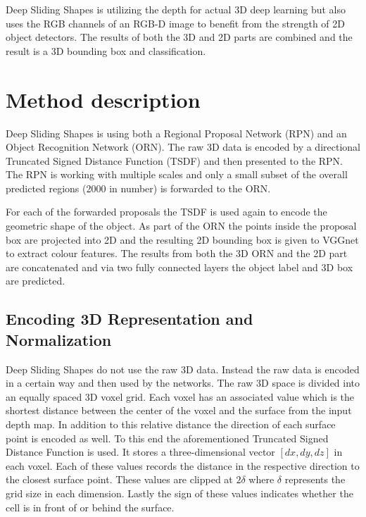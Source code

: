 \documentclass[12pt]{scrartcl}
\begin{document}
Deep Sliding Shapes\cite{Song2016} is utilizing the depth for actual 3D deep
learning but also uses the RGB channels of an RGB-D image to benefit from the
strength of 2D object detectors. The results of both the 3D and 2D parts are
combined and the result is a 3D bounding box and classification.

\section{Method description}

Deep Sliding Shapes\cite{Song2016} is using both a Regional Proposal Network (RPN) and an
Object Recognition Network (ORN). The raw 3D data is encoded by a directional
Truncated Signed Distance Function (TSDF) and then presented to the RPN.
The RPN is working with multiple scales and only a small subset of the overall
predicted regions (2000 in number) is forwarded to the ORN.

For each of the forwarded proposals the TSDF is used again to encode the geometric
shape of the object. As part of the ORN the points inside the proposal box
are projected into 2D and the resulting 2D bounding box is given to VGGnet\cite{Simonyan2015}
to extract colour features. The results from both the 3D ORN and the 2D part
are concatenated and via two fully connected layers the object label and 3D box
are predicted.

\subsection{Encoding 3D Representation and Normalization}

Deep Sliding Shapes do not use the raw 3D data. Instead the raw data is
encoded in a certain way and then used by the networks. The raw 3D space
is divided into an equally spaced 3D voxel grid. Each voxel has an associated
value which is the shortest distance between the center of the voxel and
the surface from the input depth map. In addition to this relative distance
the direction of each surface point is encoded as well. To this end the
aforementioned Truncated Signed Distance Function is used. It stores a
three-dimensional vector \([dx, dy, dz]\) in each voxel. Each of these
values records the distance in the respective direction to the closest
surface point. These values are clipped at \(2\delta\) where \(\delta\) represents
the grid size in each dimension. Lastly the sign of these values indicates
whether the cell is in front of or behind the surface.
\end{document}
